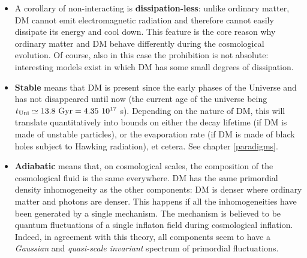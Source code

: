 \begin{itemize}
This does not mean that DM absolutely can not have any interactions (other than the gravitational one) with itself or with the ordinary matter. Quite to the contrary, in most models the production of DM in the early universe does require non-zero interactions (as discussed at length in chapter \ref{chapter:production}). Furthermore, essentially all the search strategies rely on the existence of non-zero interactions  (see part \ref{part:detection} for details). Notably, DM particles with SM weak interactions, or with interactions of similar strength, fall into the `non-interacting' class, i.e., such interactions are feeble enough to be neglected in astrophysical considerations as well as for late cosmology.

\item[$\circ$]  A corollary of non-interacting is {\bf dissipation-less}: \label{dissipationless} unlike ordinary matter, DM cannot emit electromagnetic radiation and therefore cannot easily dissipate its energy and cool down. This feature is the core reason why ordinary matter and DM behave differently during the cosmological evolution. Of course, also in this case the prohibition is not absolute: interesting models exist in which DM has some small degrees of dissipation. 

\item[$\circ$] 
{\bf Stable} means that DM is present since the early phases of the Universe and has not disappeared until now (the current age of the universe being $t_{\rm Uni} \simeq 13.8 \ {\rm Gyr} = 4.35  \ 10^{17}$ s). Depending on the nature of DM, this will translate quantitatively into bounds on either the decay lifetime (if DM is made of unstable particles), or the evaporation rate (if DM is made of black holes subject to Hawking radiation), et cetera. See chapter \ref{paradigms}.

\item[$\circ$] 
{\bf Adiabatic} means that, on cosmological scales,
the composition of the cosmological fluid is the same everywhere.
DM has the same primordial density inhomogeneity as the other components:
DM is denser where ordinary matter and photons are denser.
This happens if all the inhomogeneities have been generated by a single mechanism.
The mechanism is believed to be
quantum fluctuations of a single inflaton field during cosmological inflation.
Indeed, in agreement with this theory, 
all components seem to have a {\em Gaussian} and {\em quasi-scale invariant} spectrum of primordial fluctuations.
\end{itemize}




